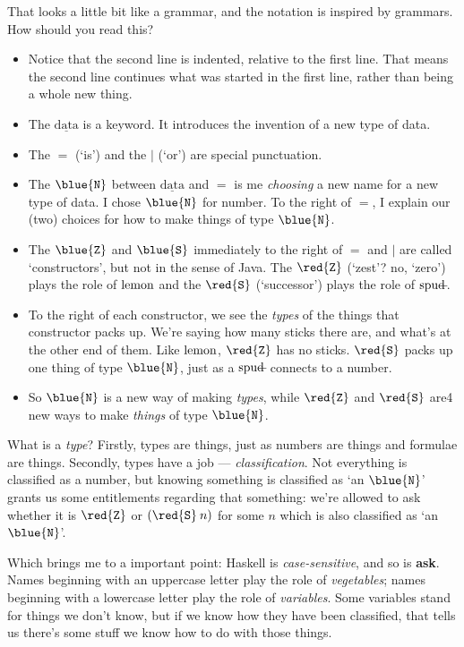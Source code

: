 \documentclass{book}
\newcommand{\D}[1]{\blue{\mathtt{#1}}}
\newcommand{\C}[1]{\red{\mathtt{#1}}}
\newcommand{\K}[1]{\underline{\mathrm{#1}}}
\begin{document}
That looks a little bit like a grammar, and the notation is inspired by grammars. How should you read this?
\begin{itemize}
\item Notice that the second line is indented, relative to the first line. That means the second line continues what was started in the first line, rather than being a whole new thing.
\item The $\K{data}$ is a keyword. It introduces the invention of a new type of data.
\item The $=$ (`is') and the $|$ (`or') are special punctuation.
\item The $\D{N}$ between $\K{data}$ and $=$ is me \emph{choosing} a new name for a new type of data. I chose $\D{N}$ for number. To the right of $=$, I explain our (two) choices for how to make things of type $\D{N}$.
\item The $\D{Z}$ and $\D{S}$ immediately to the right of $=$ and $|$ are called `constructors', but not in the sense of Java. The $\C{Z}$ (`zest'? no, `zero') plays the role of $\mbox{lemon}$ and the $\C{S}$ (`successor') plays the role of $\mbox{spud}\!\!\!-\!\!\!\;$.
\item To the right of each constructor, we see the \emph{types} of the things that constructor packs up. We're saying how many sticks there are, and what's at the other end of them. Like $\mbox{lemon}$, $\C{Z}$ has no sticks. $\C{S}$ packs up one thing of type $\D{N}$, just as a $\mbox{spud}\!\!\!-\!\!\!\;$ connects to a number.
\item So $\D{N}$ is a new way of making \emph{types}, while $\C{Z}$ and $\C{S}$ are4 new ways to make \emph{things} of type $\D{N}$.
\end{itemize}

What is a \emph{type}? Firstly, types are things, just as numbers are things and formulae are things. Secondly, types have a job --- \emph{classification}. Not everything is classified as a number, but knowing something is classified as `an $\D{N}$' grants us some entitlements regarding that something: we're allowed to ask whether it is $\C{Z}$ or $(\C{S}\:n)$ for some $n$ which is also classified as `an $\D{N}$'.

Which brings me to a important point: Haskell is \emph{case-sensitive}, and so is \textbf{ask}. Names beginning with an uppercase letter play the role of \emph{vegetables}; names beginning with a lowercase letter play the role of \emph{variables}. Some variables stand for things we don't know, but if we know how they have been classified, that tells us there's some stuff we know how to do with those things.
\end{document}
